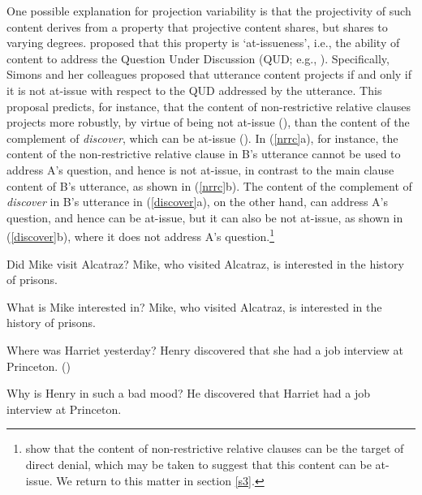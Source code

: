 \documentclass[11pt,fleqn]{article}
\newcommand{\6}{\mbox{$[\hspace*{-.6mm}[$}}
\newcommand{\9}{\mbox{$]\hspace*{-.6mm}]$}}
\def\infelic{{\leavevmode\llap{\#}}}
\begin{document}
One possible explanation for projection variability is that the projectivity of such content derives from a property that projective content shares, but shares to varying degrees. \citet{brst-salt10} proposed that this property is `at-issueness', i.e., the ability of content to address the Question Under Discussion (QUD; e.g., \citealt{roberts12}). Specifically, Simons and her colleagues proposed that utterance content projects if and only if it is not at-issue with respect to the QUD addressed by the utterance. This proposal predicts, for instance, that the content of non-restrictive relative clauses projects more robustly, by virtue of being not at-issue (\citealt{potts05}), than the content of the complement of {\em discover}, which can be at-issue (\citealt{simons07}).  In (\ref{nrrc}a), for instance, the content of the non-restrictive relative clause in B's utterance cannot be used to address A's question, and hence is not at-issue, in contrast to the main clause content of B's utterance, as shown in (\ref{nrrc}b). The content of the complement of {\em discover} in B's utterance in (\ref{discover}a), on the other hand, can address A's question, and hence can be at-issue, but it can also be not at-issue, as shown in (\ref{discover}b), where it does not address A's question.\footnote{\citet{syrett-koev2015} show that the content of non-restrictive relative clauses can be the target of direct denial, which may be taken to suggest that this content can be at-issue. We return to this matter in section \ref{s3}.}

\begin{exe}
\ex\label{nrrc}
\begin{xlist}
\ex
\begin{xlist}
 Did Mike visit Alcatraz?
 \infelic Mike, who visited Alcatraz, is interested in the history of prisons.
\end{xlist}


\ex
\begin{xlist}
 What is Mike interested in?
 Mike, who visited Alcatraz, is interested in the history of prisons.
\end{xlist}


\end{xlist}

\ex\label{discover}
\begin{xlist}
\ex
\begin{xlist}
 Where was Harriet yesterday?
 Henry discovered that she had a job interview at Princeton. \hfill (\citealt[1035]{simons07})
\end{xlist}
\ex
\begin{xlist}
 Why is Henry in such a bad mood?
 He discovered that Harriet had a job interview at Princeton. 
\end{xlist}
\end{xlist}
\end{exe}
\end{document}
